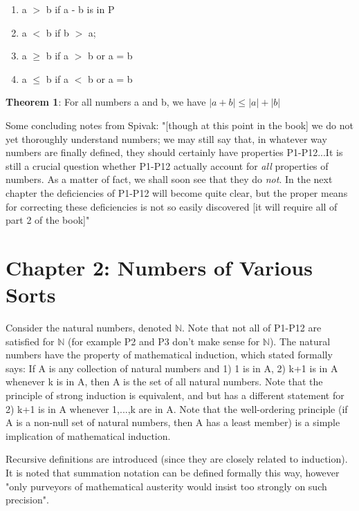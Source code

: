 \documentclass{article}
\begin{document}
\begin{enumerate}
	\item a $>$ b if a - b is in P
	\item a $<$ b if b $>$ a;
	\item a $\geq$ b if a $>$ b or a = b
	\item a $\leq$ b if a $<$ b or a = b
\end{enumerate}

\textbf{Theorem 1}: For all numbers a and b, we have $ |a+b| \leq |a|+|b| $

\begin{flushleft}
Some concluding notes from Spivak: "[though at this point in the book] we do not yet thoroughly understand numbers; we may still say that, in whatever way numbers are finally defined, they should certainly have properties P1-P12...It is still a crucial question whether P1-P12 actually account for \textit{all} properties of numbers. As a matter of fact, we shall soon see that they do \textit{not}. In the next chapter the deficiencies of P1-P12 will become quite clear, but the proper means for correcting these deficiencies is not so easily discovered [it will require all of part 2 of the book]"
\end{flushleft}

\section*{Chapter 2: Numbers of Various Sorts}

\begin{flushleft}
Consider the natural numbers, denoted $\mathbb{N}$. Note that not all of P1-P12 are satisfied for $\mathbb{N}$ (for example P2 and P3 don't make sense for $\mathbb{N}$). The natural numbers have the property of mathematical induction, which stated formally says: If A is any collection of natural numbers and 1) 1 is in A, 2) k+1 is in A whenever k is in A, then A is the set of all natural numbers. Note that the principle of strong induction is equivalent, and but has a different statement for 2) k+1 is in A whenever 1,...,k are in A. Note that the well-ordering principle (if A is a non-null set of natural numbers, then A has a least member) is a simple implication of mathematical induction.
\end{flushleft}

\begin{flushleft}
Recursive definitions are introduced (since they are closely related to induction). It is noted that summation notation can be defined formally this way, however "only purveyors of mathematical austerity would insist too strongly on such precision".
\end{flushleft}
\end{document}
